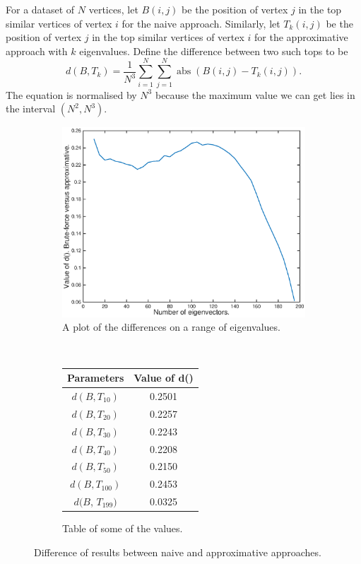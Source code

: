 \documentclass[12pt]{report}
\begin{document}
For a dataset of $N$ vertices, let $B(i,j)$ be the position of vertex $j$ in
the top similar vertices of vertex $i$ for the naive approach. Similarly, let
$T_k(i,j)$ be the position of vertex $j$ in the top similar vertices of vertex
$i$ for the approximative approach with $k$ eigenvalues. Define the difference
between two such tops to be
\begin{equation}
  d(B, T_k) = \frac{1}{N^3}
    \sum_{i=1}^N \sum_{j=1}^N \operatorname{abs}(B(i,j) - T_k(i,j)).
\end{equation}
The equation is normalised by $N^3$ because the maximum value we can get lies in
the interval $(N^2, N^3)$.
%
\begin{figure}[tpb]
        \centering
        \begin{subfigure}[b]{0.6\textwidth}
	        \includegraphics[width=\textwidth]{no-of-eigenvectors}
        		\caption{A plot of the differences on a range of eigenvalues.}
        \end{subfigure}%
        ~
        \begin{subfigure}[b]{0.4\textwidth}
           \centering
           \def\arraystretch{1.5}
           \begin{tabular}{|c|c|}
	   \hline
	   Parameters & Value of d() \\
	   \hline
	   $d(B, T_{10})$ & 0.2501 \\
	   \hline
	   $d(B, T_{20})$ & 0.2257   \\
	   \hline
   	   $d(B, T_{30})$ & 0.2243   \\
	   \hline
	   $d(B, T_{40})$ & 0.2208   \\
	   \hline
	   $d(B, T_{50})$ & 0.2150 \\
	   \hline
	   $d(B, T_{100})$ & 0.2453\\
	   \hline
	    $d(B$, $T_{199})$ & 0.0325 \\
	    \hline
	   \end{tabular}
	   \caption{Table of some of the values.}
	   \label{tbl:comparisons}
        \end{subfigure}%
        \caption{Difference of results between naive and approximative approaches.}
	\label{fig:no-of-eigenvectors}
\end{figure}
%
\end{document}
